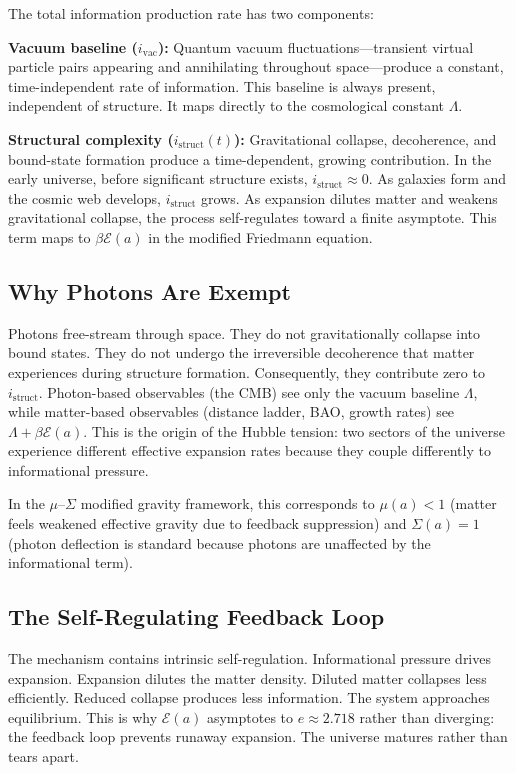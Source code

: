 \documentclass[twocolumn,superscriptaddress,prl,amsmath,amssymb]{revtex4-2}
\begin{document}
The total information production rate has two components:

\textbf{Vacuum baseline ($i_\text{vac}$):} Quantum vacuum fluctuations---transient virtual particle pairs appearing and annihilating throughout space---produce a constant, time-independent rate of information. This baseline is always present, independent of structure. It maps directly to the cosmological constant $\Lambda$.

\textbf{Structural complexity ($i_\text{struct}(t)$):} Gravitational collapse, decoherence, and bound-state formation produce a time-dependent, growing contribution. In the early universe, before significant structure exists, $i_\text{struct} \approx 0$. As galaxies form and the cosmic web develops, $i_\text{struct}$ grows. As expansion dilutes matter and weakens gravitational collapse, the process self-regulates toward a finite asymptote. This term maps to $\beta\mathcal{E}(a)$ in the modified Friedmann equation.

\subsection{Why Photons Are Exempt}

Photons free-stream through space. They do not gravitationally collapse into bound states. They do not undergo the irreversible decoherence that matter experiences during structure formation. Consequently, they contribute zero to $i_\text{struct}$. Photon-based observables (the CMB) see only the vacuum baseline $\Lambda$, while matter-based observables (distance ladder, BAO, growth rates) see $\Lambda + \beta\mathcal{E}(a)$. This is the origin of the Hubble tension: two sectors of the universe experience different effective expansion rates because they couple differently to informational pressure.

In the $\mu$--$\Sigma$ modified gravity framework, this corresponds to $\mu(a) < 1$ (matter feels weakened effective gravity due to feedback suppression) and $\Sigma(a) = 1$ (photon deflection is standard because photons are unaffected by the informational term).

\subsection{The Self-Regulating Feedback Loop}

The mechanism contains intrinsic self-regulation. Informational pressure drives expansion. Expansion dilutes the matter density. Diluted matter collapses less efficiently. Reduced collapse produces less information. The system approaches equilibrium. This is why $\mathcal{E}(a)$ asymptotes to $e \approx 2.718$ rather than diverging: the feedback loop prevents runaway expansion. The universe matures rather than tears apart.
\end{document}
